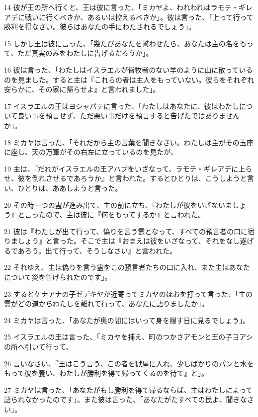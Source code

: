 \par 14 彼が王の所へ行くと、王は彼に言った、「ミカヤよ、われわれはラモテ・ギレアデに戦いに行くべきか、あるいは控えるべきか」。彼は言った、「上って行って勝利を得なさい。彼らはあなたの手にわたされるでしょう」。
\par 15 しかし王は彼に言った、「幾たびあなたを誓わせたら、あなたは主の名をもって、ただ真実のみをわたしに告げるだろうか」。
\par 16 彼は言った、「わたしはイスラエルが皆牧者のない羊のように山に散っているのを見ました。すると主は『これらの者は主人をもっていない。彼らをそれぞれ安らかに、その家に帰らせよ』と言われました」。
\par 17 イスラエルの王はヨシャパテに言った、「わたしはあなたに、彼はわたしについて良い事を預言せず、ただ悪い事だけを預言すると告げたではありませんか」。
\par 18 ミカヤは言った、「それだから主の言葉を聞きなさい。わたしは主がその玉座に座し、天の万軍がその右左に立っているのを見たが、
\par 19 主は、『だれがイスラエルの王アハブをいざなって、ラモテ・ギレアデに上らせ、彼を倒れさせるであろうか』と言われた。するとひとりは、こうしようと言い、ひとりは、ああしようと言った。
\par 20 その時一つの霊が進み出て、主の前に立ち、『わたしが彼をいざないましょう』と言ったので、主は彼に『何をもってするか』と言われた。
\par 21 彼は『わたしが出て行って、偽りを言う霊となって、すべての預言者の口に宿りましょう』と言った。そこで主は『おまえは彼をいざなって、それをなし遂げるであろう。出て行って、そうしなさい』と言われた。
\par 22 それゆえ、主は偽りを言う霊をこの預言者たちの口に入れ、また主はあなたについて災を告げられたのです」。
\par 23 するとケナアナの子ゼデキヤが近寄ってミカヤのほおを打って言った、「主の霊がどの道からわたしを離れて行って、あなたに語りましたか」。
\par 24 ミカヤは言った、「あなたが奥の間にはいって身を隠す日に見るでしょう」。
\par 25 イスラエルの王は言った、「ミカヤを捕え、町のつかさアモンと王の子ヨアシの所へ引いて行って、
\par 26 言いなさい、『王はこう言う、この者を獄屋に入れ、少しばかりのパンと水をもって彼を養い、わたしが勝利を得て帰ってくるのを待て』と」。
\par 27 ミカヤは言った、「あなたがもし勝利を得て帰るならば、主はわたしによって語られなかったのです」。また彼は言った、「あなたがたすべての民よ、聞きなさい」。
